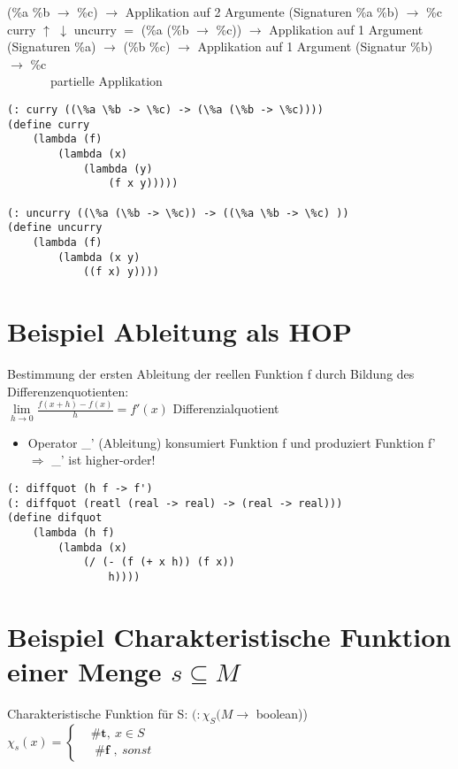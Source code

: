 \documentclass[a4paper, 20pt, openany]{book}
\begin{document}
(\%a \%b $\rightarrow$ \%c) 		$\rightarrow$	Applikation auf 2 Argumente (Signaturen \%a \%b) $\rightarrow$ \%c\\
curry $\uparrow$ $\downarrow$ uncurry										$=$
(\%a (\%b $\rightarrow$ \%c)) 		$\rightarrow$	Applikation auf 1 Argument (Signaturen \%a) $\rightarrow$ (\%b \%c) $\rightarrow$ Applikation auf 1 Argument (Signatur \%b) $\rightarrow$ \%c \\
\ \ \ \ \ \ \ partielle Applikation

\begin{lstlisting}
(: curry ((\%a \%b -> \%c) -> (\%a (\%b -> \%c))))
(define curry
	(lambda (f)
		(lambda (x)
			(lambda (y)
				(f x y)))))

(: uncurry ((\%a (\%b -> \%c)) -> ((\%a \%b -> \%c) ))
(define uncurry
	(lambda (f)
		(lambda (x y)
			((f x) y))))
\end{lstlisting}

\section{Beispiel Ableitung als HOP}
Bestimmung der ersten Ableitung der reellen Funktion f durch Bildung des Differenzenquotienten:\\
$\lim \limits_{h \rightarrow 0} \frac{f(x+h) - f(x)}{h} = f'(x)$ Differenzialquotient\\
\begin{itemize}
\item Operator \_' (Ableitung) konsumiert Funktion f und produziert Funktion f' $\Rightarrow$ \_' ist higher-order!
\end{itemize}

\begin{lstlisting}
(: diffquot (h f -> f')
(: diffquot (reatl (real -> real) -> (real -> real)))
(define difquot
	(lambda (h f)
		(lambda (x)
			(/ (- (f (+ x h)) (f x))
				h))))
\end{lstlisting}

\section{Beispiel Charakteristische Funktion einer Menge $s \subseteq M$}
Charakteristische Funktion für S: $(: \chi_S (M \rightarrow$ boolean))\\
$\chi_{s} (x) = 
 \begin{cases}
  &  \textbf{\# t} , \ x \in S \\
 &  \textbf{ \# f } , \ sonst
  \end{cases}$
\end{document}
